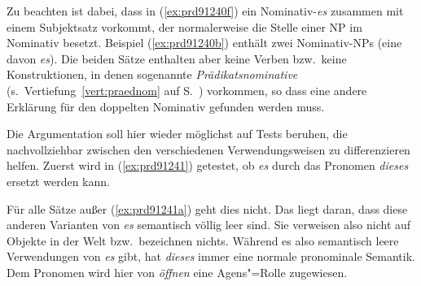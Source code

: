 \begin{exe}
  \ex\label{ex:prd91240}
  \begin{xlist}
  \end{xlist}
\end{exe}

Zu beachten ist dabei, dass in (\ref{ex:prd91240f}) ein Nominativ-\textit{es} zusammen mit einem Subjektsatz vorkommt, der normalerweise die Stelle einer NP im Nominativ besetzt.
Beispiel (\ref{ex:prd91240b}) enthält zwei Nominativ-NPs (eine davon \textit{es}). 
Die beiden Sätze enthalten aber keine Verben bzw.\ keine Konstruktionen, in denen sogenannte \textit{Prädikatsnominative} (s.\ Vertiefung~\ref{vert:praednom} auf S.~\pageref{vert:praednom}) vorkommen, so dass eine andere Erklärung für den doppelten Nominativ gefunden werden muss.

Die Argumentation soll hier wieder möglichst auf Tests beruhen, die nachvollziehbar zwischen den verschiedenen Verwendungsweisen zu differenzieren helfen.
Zuerst wird in (\ref{ex:prd91241}) getestet, ob \textit{es} durch das Pronomen \textit{dieses} ersetzt werden kann.

\begin{exe}
  \ex\label{ex:prd91241}
  \begin{xlist}
  \end{xlist}
\end{exe}

Für alle Sätze außer (\ref{ex:prd91241a}) geht dies nicht.
Das liegt daran, dass diese anderen Varianten von \textit{es} semantisch völlig leer sind.
Sie verweisen also nicht auf Objekte in der Welt bzw.\ bezeichnen nichts.
Während es also semantisch leere Verwendungen von \textit{es} gibt, hat \textit{dieses} immer eine normale pronominale Semantik.
Dem Pronomen wird hier von \textit{öffnen} eine Agens"=Rolle zugewiesen.

